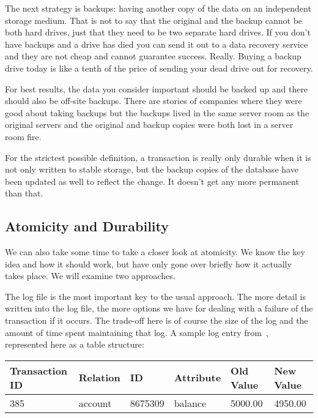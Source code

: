 The next strategy is backups: having another copy of the data on an independent storage medium. That is not to say that the original and the backup cannot be both hard drives, just that they need to be two separate hard drives. If you don't have backups and a drive has died you can send it out to a data recovery service and they are not cheap and cannot guarantee success. Really. Buying a backup drive today is like a tenth of the price of sending your dead drive out for recovery. 

For best results, the data you consider important should be backed up and there should also be off-site backups. There are stories of companies where they were good about taking backups but the backups lived in the same server room as the original servers and the original and backup copies were both lost in a server room fire.

For the strictest possible definition, a transaction is really only durable when it is not only written to stable storage, but the backup copies of the database have been updated as well to reflect the change. It doesn't get any more permanent than that. 

\subsection*{Atomicity and Durability}

We can also take some time to take a closer look at atomicity. We know the key idea and how it should work, but have only gone over briefly how it actually takes place. We will examine two approaches.

The log file is the most important key to the usual approach. The more detail is written into the log file, the more options we have for dealing with a failure of the transaction if it occurs. The trade-off here is of course the size of the log and the amount of time spent maintaining that log. A sample log entry from~\cite{dsc}, represented here as a table structure: 

\begin{center}
\begin{tabular}{|l|l|l|l|l|l|}\hline
	\textbf{Transaction ID} & \textbf{Relation} & \textbf{ID} & \textbf{Attribute} & \textbf{Old Value} & \textbf{New Value}\\ \hline
	385 & account & 8675309 & balance & 5000.00 & 4950.00 \\ \hline
\end{tabular}
\end{center}

